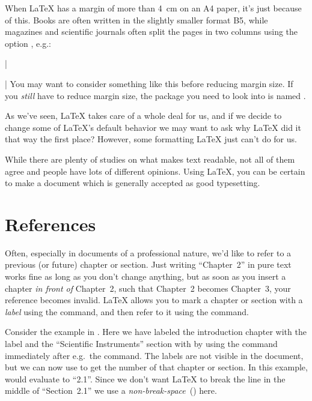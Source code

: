 {When \LaTeX{} has a margin of more than 4~cm on an A4 paper, it's just because of this. Books are often written in the slightly smaller format B5, while magazines and scientific journals often split the pages in two columns using the option , e.g.:

\latexone|\usepackage[a4paper,twocolumn]{article}|
\noindent You may want to consider something like this before reducing margin size. If you \emph{still} have to reduce margin size, the package you need to look into is named .

As we've seen, \LaTeX{} takes care of a whole deal for us, and if we decide to change some of \LaTeX{}'s default behavior we may want to ask why \LaTeX{} did it that way the first place? However, some formatting \LaTeX{} just can't do for us.

While there are plenty of studies on what makes text readable, not all of them agree and people have lots of different opinions. Using \LaTeX{}, you can be certain to make a document which is generally accepted as good typesetting.

\section{References}
\index{\latexin{\label}}
\index{\latexin{\ref}}
Often, especially in documents of a professional nature, we'd like to refer to a previous (or future) chapter or section. Just writing ``Chapter~2'' in pure text works fine as long as you don't change anything, but as soon as you insert a chapter \emph{in front of} Chapter~2, such that Chapter~2 becomes Chapter~3, your reference becomes invalid. \LaTeX{} allows you to mark a chapter or section with a \emph{label} using the \latexin{\label} command, and then refer to it using the \latexin{\ref} command.

Consider the example in . Here we have labeled the introduction chapter with the label  and the ``Scientific Instruments'' section with  by using the \latexin{\label} command immediately after e.g.\ the \latexin{\chapter} command. The labels are not visible in the document, but we can now use \latexin{\ref} to get the number of that chapter or section. In this example, \latexin{\ref{sec:instruments}} would evaluate to ``2.1''. Since we don't want \LaTeX{} to break the line in the middle of ``Section~2.1'' we use a \emph{non-break-space}~(\latexin{~}) here.

}
